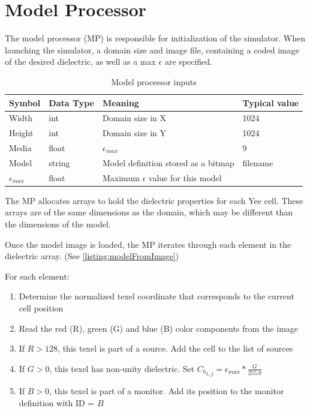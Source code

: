 \section{Model Processor}\label{sec:modelProcessor}

The model processor (MP) is responsible for initialization of the simulator. When launching the simulator, a domain size and image file, containing a coded image of the desired dielectric, as well as a max $\epsilon$ are specified.

\begin{table}[h!]
	\centering
	\caption{Model processor inputs}
	\label{tab:modelProcessorInputs}
	\begin{tabular}{l | l | l | l}
		Symbol	& Data Type & Meaning & Typical value				\\
		\hline														
		Width	& int 		& Domain size in X & 1024				\\
		Height	& int 		& Domain size in Y & 1024				\\
		Media	& float 	& $\epsilon_{max}$ & 9						\\
		Model	& string	& Model definition stored as a bitmap & filename \\
		$\epsilon_{max}$ & float & Maximum $\epsilon$ value for this model
	\end{tabular}
\end{table}

The MP allocates arrays to hold the dielectric properties for each Yee cell. These arrays are of the same dimensions as the domain, which may be different than the dimensions of the model. 

Once the model image is loaded, the MP iterates through each element in the dielectric array. (See \autoref{listing:modelFromImage})

For each element:

\begin{enumerate}
	\item Determine the normalized texel coordinate that corresponds to the current cell position	
	\item Read the red (R), green (G) and blue (B) color components from the image
	\item If $R > 128$, this texel is part of a source. Add the cell to the list of sources
	\item If $G > 0$, this texel has non-unity dielectric. Set ${C_b}_{i,j} = \epsilon_{max} * \frac{G}{255.0}$
	\item If $B > 0$, this texel is part of a monitor. Add its position to the monitor definition with ID = $B$
\end{enumerate}

